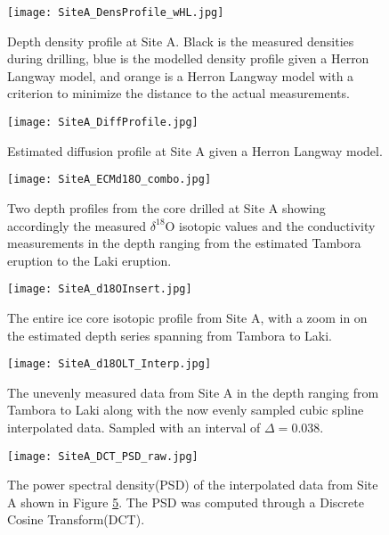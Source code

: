 \documentclass[../../CompleteThesis/Complete_1stDraft.tex]{subfiles}
\begin{document}
	
\begin{figure}
	\centering
	\texttt{[image: SiteA\_DensProfile\_wHL.jpg]}
	\caption[Density profile Site A]{Depth density profile at Site A. Black is the measured densities during drilling, blue is the modelled density profile given a Herron Langway model, and orange is a Herron Langway model with a criterion to minimize the distance to the actual measurements.}
	\label{Fig:SiteA_DensProfile_wHL}
\end{figure}

\begin{figure}
	\centering
	\texttt{[image: SiteA\_DiffProfile.jpg]}
	\caption[Diffusion profile, Site A.]{Estimated diffusion profile at Site A given a Herron Langway model.}
	\label{fig:SiteADiffProfile}
\end{figure}

\begin{figure}
	\centering
	\texttt{[image: SiteA\_ECMd18O\_combo.jpg]}
	\caption[ECM and d18O data at LT, Site A.]{Two depth profiles from the core drilled at Site A showing accordingly the measured $\delta^{18}$O isotopic values and the conductivity measurements in the depth ranging from the estimated Tambora eruption to the Laki eruption.}	
	\label{fig:SiteA_ECMd18O_combo}
\end{figure}

\begin{figure}
	\centering
	\texttt{[image: SiteA\_d18OInsert.jpg]}
	\caption[Full $\delta^{18}$O record with insert, Site A]{The entire ice core isotopic profile from Site A, with a zoom in on the estimated depth series spanning from Tambora to Laki.}
	\label{fig:SiteA_d18OInsert}
\end{figure}

\begin{figure}
	\centering
	\texttt{[image: SiteA\_d18OLT\_Interp.jpg]}
	\caption[Measured and interpolated $\delta^{18}$O data, Site A]{The unevenly measured data from Site A in the depth ranging from Tambora to Laki along with the now evenly sampled cubic spline interpolated data. Sampled with an interval of $\Delta = 0.038$.}
	\label{fig:SiteA_d18OLT_Interp}
\end{figure}

\begin{figure}
	\centering
	\texttt{[image: SiteA\_DCT\_PSD\_raw.jpg]}
	\caption[PSD of LT data, Site A]{The power spectral density(PSD) of the interpolated data from Site A shown in Figure \ref{fig:SiteA_d18OLT_Interp}. The PSD was computed through a Discrete Cosine Transform(DCT).}
	\label{fig:SiteA_DCT_PSD_raw}
\end{figure}
\end{document}
